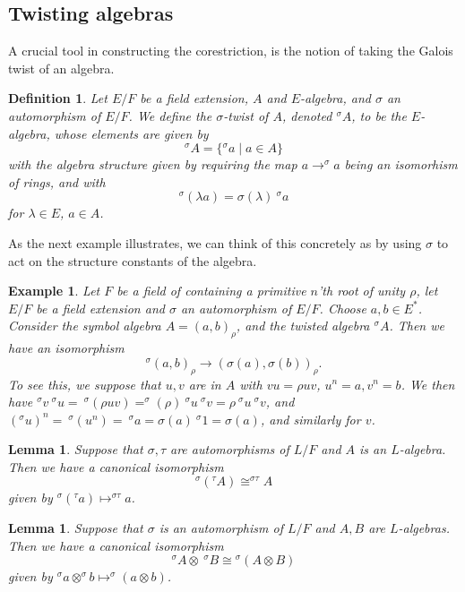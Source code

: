 \documentclass[12pt]{report}
\theoremstyle{plain}
\newtheorem{defn}[thm]{Definition}
\newtheorem{lem}[thm]{Lemma}
\newtheorem{ex}[thm]{Example}
\newcommand{\symb}[3]{
  \left(#1, #2\right)_{#3}
}
\begin{document}
\subsection{Twisting algebras}

A crucial tool in constructing the corestriction, is the notion of taking
the Galois twist of an algebra.

\begin{defn}
Let $E/F$ be a field extension, $A$ and $E$-algebra, and $\sigma$ an
automorphism of $E/F$. We define the $\sigma$-twist of $A$, denoted
$^\sigma A$, to be the $E$-algebra, whose elements are given by
\[ ^\sigma A = \{ {}^\sigma a \mid a \in A \} \]
with the algebra structure given by requiring the map $a \to ^\sigma a$
being an isomorhism of rings, and with
\[ ^\sigma (\lambda a) = \sigma(\lambda) \ {}^\sigma a \]
for $\lambda \in E$, $a \in A$.
\end{defn}

As the next example illustrates, we can think of this concretely as by using
$\sigma$ to act on the structure constants of the algebra.

\begin{ex}
Let $F$ be a field of containing a primitive $n$'th root of unity $\rho$,
let $E/F$ be a field extension and $\sigma$
an automorphism of $E/F$. Choose $a, b \in E^*$.
Consider the symbol algebra $A = \symb a b \rho$, and the twisted algebra
$^\sigma A$. Then we have an isomorphism
\[ ^\sigma \symb a b \rho \to \symb{\sigma(a)}{\sigma(b)}{\rho}. \]
To see this, we suppose that $u, v$ are in $A$ with $vu = \rho uv$, $u^n =
a, v^n = b$. We then have $^\sigma v \ ^\sigma u = \ ^\sigma(\rho uv) =
^\sigma(\rho) \ ^\sigma u \ ^\sigma v = \rho \ ^\sigma u \ ^\sigma v$, and
$(^\sigma u)^n = \ ^\sigma (u^n) = \ ^\sigma a = \sigma(a) \ ^\sigma 1 =
\sigma(a)$, and similarly for $v$.
\end{ex}

\begin{lem}
Suppose that $\sigma, \tau$ are automorphisms of $L/F$ and $A$ is an
$L$-algebra. Then we have a canonical isomorphism
\[ ^\sigma (^\tau A) \cong ^{\sigma\tau} A \]
given by $^\sigma (^\tau a) \mapsto ^{\sigma\tau} a$.
\end{lem}

\begin{lem}
Suppose that $\sigma$ is an automorphism of $L/F$ and $A, B$ are
$L$-algebras. Then we have a canonical isomorphism
\[^\sigma A \otimes \ ^\sigma B \cong {}^\sigma(A \otimes B) \]
given by $^\sigma a \otimes ^\sigma b \mapsto ^\sigma(a \otimes b)$.
\end{lem}
\end{document}
